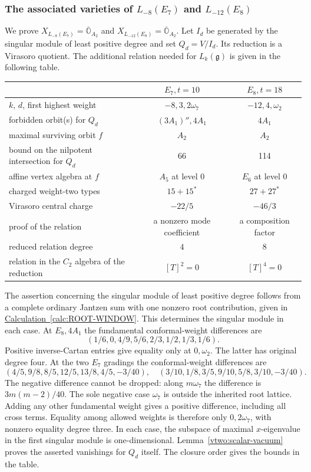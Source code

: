 \documentclass[11pt,a4paper]{amsart}
\numberwithin{equation}{section}
\theoremstyle{definition}
\theoremstyle{remark}
\newcommand{\g}{\mathfrak g}
\newcommand{\OO}{\mathbb O}
\begin{document}
\subsubsection{\texorpdfstring{The associated varieties of $L_{-8}(E_7)$ and $L_{-12}(E_8)$}{The associated varieties of L-8(E7) and L-12(E8)}}
\label{vtwo:exceptional-virasoro}
We prove $X_{L_{-8}(E_7)}=\overline{\OO}_{A_2}$ and
$X_{L_{-12}(E_8)}=\overline{\OO}_{A_2}$. 
Let $I_d$ be generated by the singular module of least positive degree
and set $Q_d=V/I_d$. Its reduction is a Virasoro quotient. The additional relation needed for $L_k(\g)$ is given in the following table.
\begin{center}\small
\begin{tabular}{@{}lcc@{}}\toprule
 & $E_7,t=10$ & $E_8,t=18$\\\midrule
$k$, $d$, first highest weight&$-8,3,2\omega_7$&$-12,4,\omega_2$\\
forbidden orbit(s) for $Q_d$&$(3A_1)'',4A_1$&$4A_1$\\
maximal surviving orbit $f$&$A_2$&$A_2$\\
bound on the nilpotent intersection for $Q_d$&66&114\\
affine vertex algebra at $f$&$A_5$ at level 0&$E_6$ at level 0\\
charged weight-two types&$15+15^*$&$27+27^*$\\
Virasoro central charge&$-22/5$&$-46/3$\\
proof of the relation&a nonzero mode coefficient&a composition factor\\
reduced relation degree&$4$&$8$\\
relation in the $C_2$ algebra of the reduction&$[T]^2=0$&$[T]^4=0$\\\bottomrule
\end{tabular}\end{center}
The assertion concerning the singular module of least positive degree follows from a complete ordinary
Jantzen sum with one nonzero root contribution, given in
\hyperref[calc:ROOT-WINDOW]{Calculation~\ref*{calc:ROOT-WINDOW}}. This determines the singular module in each case. At $E_8,4A_1$ the fundamental conformal-weight differences are
$$
 (1/6,0,4/9,5/6,2/3,1/2,1/3,1/6).
$$
Positive inverse-Cartan entries give equality only at $0,\omega_2$.
The latter has original degree four. At the two $E_7$ gradings the
conformal-weight differences are
$$
 (4/5,9/8,8/5,12/5,13/8,4/5,-3/40),\quad
 (3/10,1/8,3/5,9/10,5/8,3/10,-3/40).
$$
The negative difference cannot be dropped: along $m\omega_7$ the difference
is $3m(m-2)/40$. The sole negative case $\omega_7$ is outside the
inherited root lattice. Adding any other fundamental weight gives a
positive difference, including all cross terms. Equality among allowed
weights is therefore only $0,2\omega_7$, with nonzero equality degree
three. In each case, the subspace of maximal $x$-eigenvalue in the first
singular module is one-dimensional. Lemma~\ref{vtwo:scalar-vacuum} proves the asserted vanishings for $Q_d$
itself. The closure order gives the bounds in the table.
\end{document}
